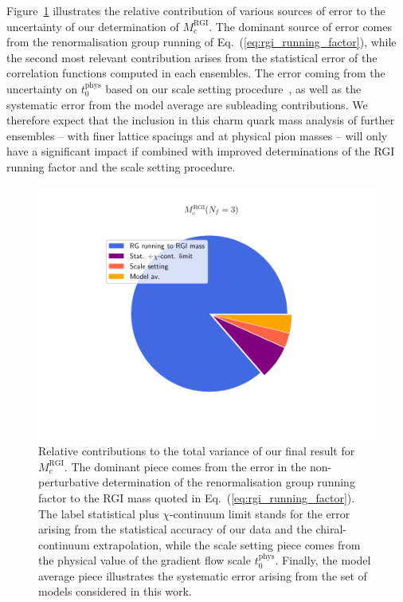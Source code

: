 Figure~\ref{fig:mc_error_contributions} illustrates the relative contribution of various sources of error to the
uncertainty of our determination of $M_c^{\mathrm{RGI}}$. The dominant source of error comes from the 
renormalisation group running of Eq.~(\ref{eq:rgi_running_factor}), while the second most relevant 
contribution arises from the statistical error of  the correlation functions computed in each ensembles.  
The  error coming from  the uncertainty on $t_0^{\mathrm{phys}}$ based on our  scale setting  procedure~\cite{MA1}, as well as the 
systematic error from the model average  are subleading contributions. We therefore expect
that the 
inclusion in this charm quark mass analysis of further ensembles -- with finer lattice spacings and at physical pion masses --  will only have a significant impact if combined with improved determinations of the RGI running factor and the scale setting procedure.
%
\begin{figure}[t!]
	\centering
	\includegraphics[scale=0.7]{./cap6/figs/mc/mc_error_pie.pdf}
	\caption{Relative contributions to the total variance of our final result for $M_c^{\mathrm{RGI}}$. The dominant piece comes from the error in the non-perturbative determination of the renormalisation group running factor to the RGI mass quoted in Eq.~(\ref{eq:rgi_running_factor}). The label statistical plus $\chi$-continuum limit stands for the error arising from the statistical accuracy of our data and the chiral-continuum extrapolation, while the scale setting piece comes from the physical value of the gradient flow scale $t_0^{\mathrm{phys}}$. Finally, the model average piece illustrates the systematic error arising from the set of models considered in this work.
          }
	\label{fig:mc_error_contributions}
\end{figure}
%


